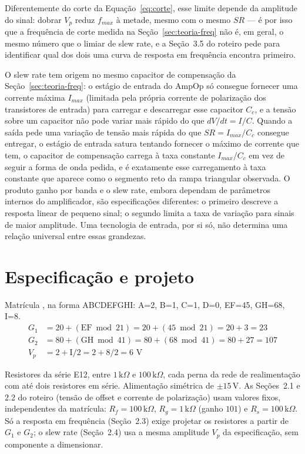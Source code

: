 \documentclass[11pt,a4paper]{article}
\begin{document}
Diferentemente do corte da Equação~\eqref{eq:corte}, esse limite depende da amplitude do sinal:
dobrar \(V_p\) reduz \(f_{max}\) à metade, mesmo com o mesmo \(SR\) — é por isso que a frequência
de corte medida na Seção~\ref{sec:teoria-freq} não é, em geral, o mesmo número que o limiar de
slew rate, e a Seção~3.5 do roteiro pede para identificar qual dos dois uma curva de resposta em
frequência encontra primeiro.

O slew rate tem origem no mesmo capacitor de compensação da Seção~\ref{sec:teoria-freq}: o
estágio de entrada do AmpOp só consegue fornecer uma corrente máxima \(I_{max}\) (limitada pela
própria corrente de polarização dos transistores de entrada) para carregar e descarregar esse
capacitor \(C_c\), e a tensão sobre um capacitor não pode variar mais rápido do que
\(dV/dt=I/C\). Quando a saída pede uma variação de tensão mais rápida do que
\(SR=I_{max}/C_c\) consegue entregar, o estágio de entrada satura tentando fornecer o máximo de
corrente que tem, o capacitor de compensação carrega à taxa constante \(I_{max}/C_c\) em vez de
seguir a forma de onda pedida, e é exatamente esse carregamento à taxa constante que aparece como
o segmento reto da rampa triangular observada. O produto ganho por banda e o slew rate, embora dependam de parâmetros internos do amplificador,
são especificações diferentes: o primeiro descreve a resposta linear de pequeno sinal;
o segundo limita a taxa de variação para sinais de maior amplitude. Uma tecnologia de
entrada, por si só, não determina uma relação universal entre essas grandezas.

\section{Especificação e projeto}
\label{sec:espec}

\begin{espec}
Matrícula , na forma ABCDEFGHI: A=2, B=1, C=1, D=0, EF=45, GH=68, I=8.
\begin{align*}
G_1 &= 20+(\text{EF}\bmod{21}) = 20+(45\bmod{21}) = 20+3 = 23 \\
G_2 &= 80+(\text{GH}\bmod{41}) = 80+(68\bmod{41}) = 80+27 = 107 \\
V_p &= 2+\text{I}/2 = 2+8/2 = 6\text{ V}
\end{align*}
\end{espec}

Resistores da série E12, entre \(1\,\text{k}\Omega\) e \(100\,\text{k}\Omega\), cada perna da
rede de realimentação com até dois resistores em série. Alimentação simétrica de
\(\pm15\,\text{V}\). As Seções~2.1 e 2.2 do roteiro (tensão de offset e corrente de polarização)
usam valores fixos, independentes da matrícula: \(R_f=100\,\text{k}\Omega\),
\(R_g=1\,\text{k}\Omega\) (ganho \(101\)) e \(R_s=100\,\text{k}\Omega\). Só a resposta em
frequência (Seção~2.3) exige projetar os resistores a partir de \(G_1\) e \(G_2\); o slew rate
(Seção~2.4) usa a mesma amplitude \(V_p\) da especificação, sem componente a dimensionar.
\end{document}
